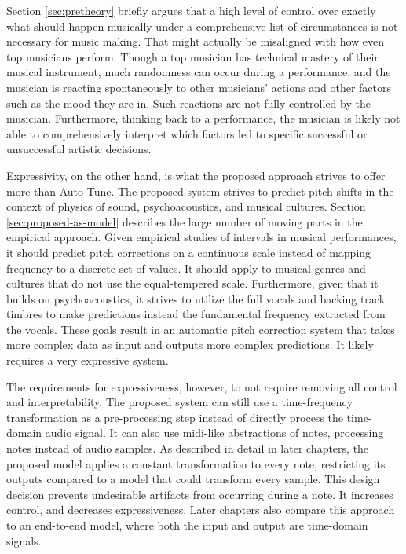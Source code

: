 Section \ref{sec:pretheory} briefly argues that a high level of control over exactly what should happen musically under a comprehensive list of circumstances is not necessary for music making. That might actually be misaligned with how even top musicians perform. Though a top musician has technical mastery of their musical instrument, much randomness can occur during a performance, and the musician is reacting spontaneously to other musicians' actions and other factors such as the mood they are in. Such reactions are not fully controlled by the musician. Furthermore, thinking back to a performance, the musician is likely not able to comprehensively interpret which factors led to specific successful or unsuccessful artistic decisions. 

Expressivity, on the other hand, is what the proposed approach strives to offer more than Auto-Tune. The proposed system strives to predict pitch shifts in the context of physics of sound, psychoacoustics, and musical cultures. Section \ref{sec:proposed-as-model} describes the large number of moving parts in the empirical approach. Given empirical studies of intervals in musical performances, it should predict pitch corrections on a continuous scale instead of mapping frequency to a discrete set of values. It should apply to musical genres and cultures that do not use the equal-tempered scale. Furthermore, given that it builds on psychoacoustics, it strives to utilize the full vocals and backing track timbres to make predictions instead the fundamental frequency extracted from the vocals. These goals result in an automatic pitch correction system that takes more complex data as input and outputs more complex predictions. It likely requires a very expressive system.

The requirements for expressiveness, however, to not require removing all control and interpretability. The proposed system can still use a time-frequency transformation as a pre-processing step instead of directly process the time-domain audio signal. It can also use \gls{midi}-like abstractions of notes, processing notes instead of audio samples. As described in detail in later chapters, the proposed model applies a constant transformation to every note, restricting its outputs compared to a model that could transform every sample. This design decision prevents undesirable artifacts from occurring during a note. It increases control, and decreases expressiveness. Later chapters also compare this approach to an end-to-end model, where both the input and output are time-domain signals. 

